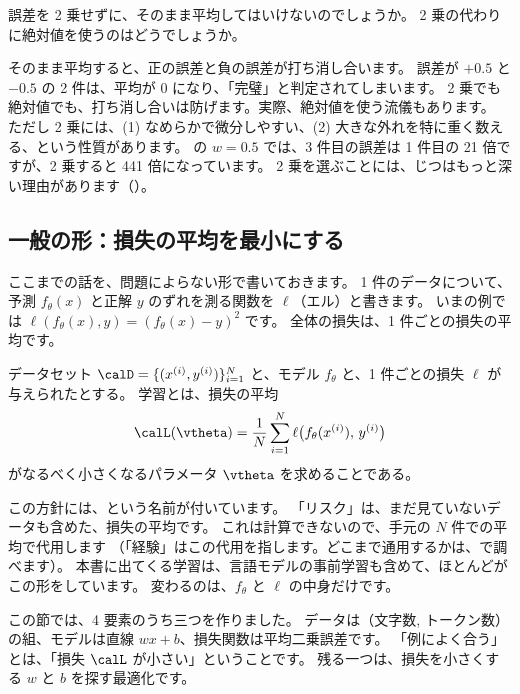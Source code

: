 \begin{quiz}
誤差を 2 乗せずに、そのまま平均してはいけないのでしょうか。
2 乗の代わりに絶対値を使うのはどうでしょうか。
\end{quiz}

そのまま平均すると、正の誤差と負の誤差が打ち消し合います。
誤差が $+0.5$ と $-0.5$ の 2 件は、平均が 0 になり、「完璧」と判定されてしまいます。
2 乗でも絶対値でも、打ち消し合いは防げます。実際、絶対値を使う流儀もあります。
ただし 2 乗には、(1) なめらかで微分しやすい、(2) 大きな外れを特に重く数える、という性質があります。
の $w=0.5$ では、3 件目の誤差は 1 件目の 21 倍ですが、2 乗すると 441 倍になっています。
2 乗を選ぶことには、じつはもっと深い理由があります（）。

\subsection*{一般の形：損失の平均を最小にする}

ここまでの話を、問題によらない形で書いておきます。
1 件のデータについて、予測 $f_\theta(x)$ と正解 $y$ のずれを測る関数を $\ell$（エル）と書きます。
いまの例では $\ell(f_\theta(x), y) = (f_\theta(x) - y)^2$ です。
全体の損失は、1 件ごとの損失の平均です。

\begin{definition}[教師あり学習で最小にする量]\label{def:ml-erm}
データセット $\calD = \{(x^{(i)}, y^{(i)})\}_{i=1}^{N}$ と、モデル $f_\theta$ と、1 件ごとの損失 $\ell$ が与えられたとする。
学習とは、損失の平均
\begin{equation}
\calL(\vtheta) = \frac{1}{N}\sum_{i=1}^{N} \ell\bigl(f_\theta(x^{(i)}),\, y^{(i)}\bigr)
\label{eq:ml-erm}
\end{equation}
がなるべく小さくなるパラメータ $\vtheta$ を求めることである。
\end{definition}

この方針には、という名前が付いています。
「リスク」は、まだ見ていないデータも含めた、損失の平均です。
これは計算できないので、手元の $N$ 件での平均で代用します
（「経験」はこの代用を指します。どこまで通用するかは、で調べます）。
本書に出てくる学習は、言語モデルの事前学習も含めて、ほとんどがこの形をしています。
変わるのは、$f_\theta$ と $\ell$ の中身だけです。

この節では、4 要素のうち三つを作りました。
データは（文字数, トークン数）の組、モデルは直線 $wx+b$、損失関数は平均二乗誤差です。
「例によく合う」とは、「損失 $\calL$ が小さい」ということです。
残る一つは、損失を小さくする $w$ と $b$ を探す最適化です。


